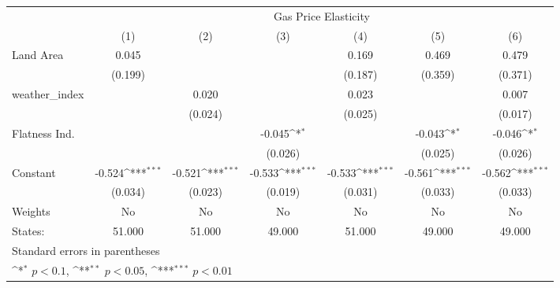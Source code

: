 {
\def\sym#1{\ifmmode^{#1}\else\(^{#1}\)\fi}
\begin{tabular}{l*{6}{c}}
\hline\hline
            &\multicolumn{6}{c}{Gas Price Elasticity}                                                                                           \\
            &\multicolumn{1}{c}{(1)}         &\multicolumn{1}{c}{(2)}         &\multicolumn{1}{c}{(3)}         &\multicolumn{1}{c}{(4)}         &\multicolumn{1}{c}{(5)}         &\multicolumn{1}{c}{(6)}         \\
\hline
Land Area   &       0.045         &                     &                     &       0.169         &       0.469         &       0.479         \\
            &     (0.199)         &                     &                     &     (0.187)         &     (0.359)         &     (0.371)         \\
[1em]
weather\_index&                     &       0.020         &                     &       0.023         &                     &       0.007         \\
            &                     &     (0.024)         &                     &     (0.025)         &                     &     (0.017)         \\
[1em]
Flatness Ind.&                     &                     &      -0.045\sym{*}  &                     &      -0.043\sym{*}  &      -0.046\sym{*}  \\
            &                     &                     &     (0.026)         &                     &     (0.025)         &     (0.026)         \\
[1em]
Constant    &      -0.524\sym{***}&      -0.521\sym{***}&      -0.533\sym{***}&      -0.533\sym{***}&      -0.561\sym{***}&      -0.562\sym{***}\\
            &     (0.034)         &     (0.023)         &     (0.019)         &     (0.031)         &     (0.033)         &     (0.033)         \\
\hline
Weights     &          No         &          No         &          No         &          No         &          No         &          No         \\
States:     &      51.000         &      51.000         &      49.000         &      51.000         &      49.000         &      49.000         \\
\hline\hline
\multicolumn{7}{l}{\footnotesize Standard errors in parentheses}\\
\multicolumn{7}{l}{\footnotesize \sym{*} \(p<0.1\), \sym{**} \(p<0.05\), \sym{***} \(p<0.01\)}\\
\end{tabular}
}
